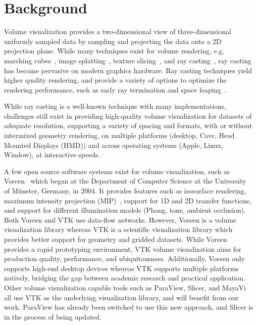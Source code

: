 \section{Background}
\label{relatedwork}

Volume visualization provides a two-dimensional view of three-dimensional
uniformly sampled data by sampling and projecting the data onto a 2D
projection plane.  While many techniques exist for volume rendering, e.g.
marching cubes~\citep{lorensen_marching_1987}, image
splatting~\citep{westover_footprint_1990}, texture
slicing~\citep{rezk-salama_interactive_2000, engel_high-quality_2001}, and ray
casting~\citep{hsu_segmented_1993, ma_parallel_1995, ma_scalable_1997,
heng_gpu-based_2005}, ray casting has become pervasive on modern graphics
hardware. Ray casting techniques yield higher quality rendering, and provide
a variety of options to optimize the rendering performance, such as early ray
termination and space leaping~\citep{yagel_accelerating_1993}.

While ray casting is a well-known technique with many implementations, challenges still exist in
providing high-quality volume visualization for datasets of adequate
resolution, supporting a variety of spacing and formats, with or without
intermixed geometry rendering, on multiple platforms (desktop, Cave, Head
Mounted Displays (HMD)) and across operating systems (Apple, Linux, Window), at
interactive speeds.

A few open source software systems exist for volume visualization, such as
Voreen~\citep{meyer-spradow_voreen:_2009} which began at the Department of
Computer Science at the University of M\"unster, Germany, in 2004.  It provides
features such as isosurface rendering, maximum intensity projection
(MIP)~\citep{wallis_three-dimensional_1989}, support for 1D and 2D transfer
functions, and support for different illumination models (Phong, tone, ambient
occlusion). Both Voreen and VTK use data-flow networks. However, Voreen is a
volume visualization library whereas VTK is a scientific visualization library
which provides better support for geometry and gridded datasets. While Voreen
provides a rapid prototyping environment, VTK volume visualization aims for
production quality, performance, and ubiquitousness. Additionally, Voreen only
supports high-end desktop devices whereas VTK supports multiple platforms
natively, bridging the gap between academic research and practical application.
Other volume visualization capable tools such as ParaView, Slicer, and
MayaVi~\citep{ramachandran2011mayavi} all use VTK as the underlying
visualization library, and will benefit from our work.  ParaView has already
been switched to use this new approach, and Slicer is in the process of being
updated.

